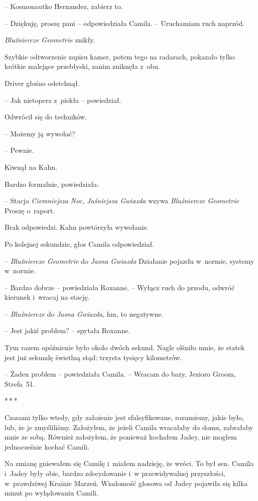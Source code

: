 \documentclass[oneside,polish,12pt,sfheadings]{mwbk}
\newcommand{\threeast}{\bigskip\par\centerline{*\,*\,*}\medskip\par}%
\begin{document}
-- Kosmonautko Hernandez, zabierz to.

-- Dziękuję, proszę pani -- odpowiedziała Camila. -- Uruchamiam ruch
naprzód.

\emph{Bluźniercze Geometrie} znikły.

Szybkie odtworzenie zapisu kamer, potem tego na radarach, pokazało tylko
krótkie malejące przebłyski, zanim zniknęła z~obu.

Driver głośno odetchnął.

-- Jak nietoperz z~piekła -- powiedział.

Odwrócił się do techników.

-- Możemy ją wywołać?

-- Pewnie.

Kiwnął na Kahn.

Bardzo formalnie, powiedziała: 

-- Stacja \emph{Ciemniejsza Noc,
Jaśniejsza Gwiazda} wzywa \emph{Bluźniercze Geometrie } Proszę o~raport.

Brak odpowiedzi. Kahn powtórzyła wywołanie.

Po kolejnej sekundzie, głos Camila odpowiedział.

-- \emph{Bluźniercze Geometrie} do \emph{Jasna Gwiazda } Działanie
pojazdu w~normie, systemy w~normie.

-- Bardzo dobrze -- powiedziała Roxanne. -- Wyłącz ruch do przodu, odwróć
kierunek i~wracaj na stację.

-- \emph{Bluźniercze} do \emph{Jasna Gwiazda}, hm, to negatywne.

-- Jest jakiś problem? -- spytała Roxanne.

Tym razem opóźnienie było około dwóch sekund. Nagle olśniło mnie, że
statek jest już sekundę świetlną stąd: trzysta tysięcy kilometrów.

-- Żaden problem -- powiedziała Camila. -- Wracam do bazy, Jezioro Groom,
Strefa~51.

\threeast

Czasami tylko wtedy, gdy założenie jest sfalsyfikowane, rozumiemy, jakie
było, lub, że je zmyśliliśmy. Założyłem, że jeżeli Camila wracałaby do
domu, zabrałaby mnie ze sobą. Również założyłem, że ponieważ kochałem
Jadey, nie mogłem jednocześnie kochać Camili.

Na zmianę gniewałem się Camilę i~miałem nadzieję, że wróci. To był sen.
Camila i~Jadey były obie, bardzo zdecydowanie i~w przewidywalnej
przyszłości, w~prawdziwej Krainie Marzeń. Wiadomość głosowa od Jadey
pojawiła się kilka minut po wylądowaniu Camili.
\end{document}
